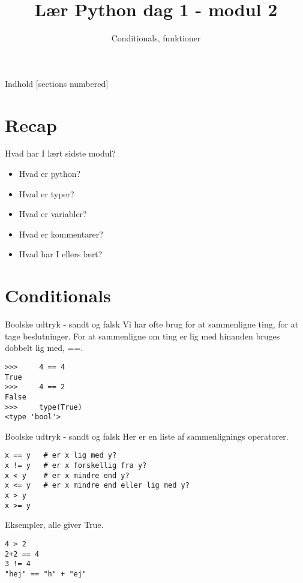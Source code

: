 \documentclass[main.tex]{subfiles}
\title{Lær Python dag 1 - modul 2}
\subtitle{Conditionals, funktioner}
\begin{document}
\maketitle

\begin{frame}{Indhold}
  [sections numbered]
  \tableofcontents[hideallsubsections]
\end{frame}

\section{Recap}
\begin{frame}[fragile]{Hvad har I lært sidste modul?}
	\begin{itemize}
		\item Hvad er python?
		\item Hvad er typer?
		\item Hvad er variabler?
		\item Hvad er kommentarer?
		\item Hvad har I ellers lært?
	\end{itemize}
\end{frame}

\section{Conditionals}
\begin{frame}[fragile]{Boolske udtryk - sandt og falsk}
	Vi har ofte brug for at sammenligne ting, for at tage beslutninger. For at sammenligne om ting er lig med hinanden bruges dobbelt lig med, ==. 
	
	\begin{lstlisting}[style=python]
>>>		4 == 4
True
>>>		4 == 2
False
>>>		type(True)
<type 'bool'>
	\end{lstlisting}
\end{frame}

\begin{frame}[fragile]{Boolske udtryk - sandt og falsk}
Her er en liste af sammenlignings operatorer.
\begin{lstlisting}[style=python]
x == y   # er x lig med y?
x != y   # er x forskellig fra y?
x < y    # er x mindre end y?
x <= y   # er x mindre end eller lig med y?
x > y
x >= y
\end{lstlisting}

Eksempler, alle giver True.
\begin{lstlisting}[style=python]
4 > 2
2+2 == 4
3 != 4
"hej" == "h" + "ej"
\end{lstlisting}
\end{frame}
\end{document}

